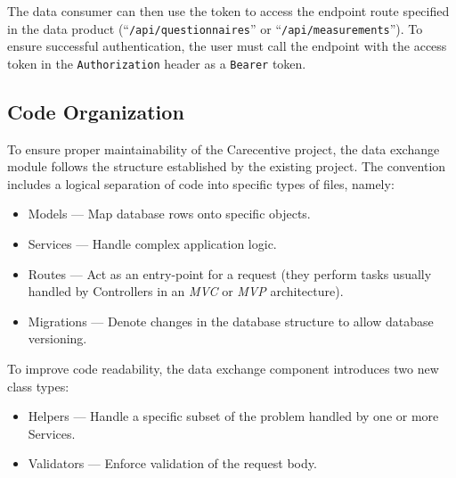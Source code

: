 The data consumer can then use the token to access the endpoint route specified in the data product (``\texttt{/api\-/questionnaires}'' or ``\texttt{/api\-/measurements}'').
To ensure successful authentication, the user must call the endpoint with the access token in the \texttt{Authorization} header as a \texttt{Bearer} token.

\subsection{Code Organization}\label{subsec:code-organization}

To ensure proper maintainability of the Carecentive project, the data exchange module follows the structure established by the existing project.
The convention includes a logical separation of code into specific types of files, namely:

\begin{itemize}
    \item Models --- Map database rows onto specific objects.
    \item Services --- Handle complex application logic.
    \item Routes --- Act as an entry-point for a request (they perform tasks usually handled by Controllers in an \textit{MVC} or \textit{MVP} architecture).
    \item Migrations --- Denote changes in the database structure to allow database versioning.
\end{itemize}

To improve code readability, the data exchange component introduces two new class types:
\begin{itemize}
    \item Helpers --- Handle a specific subset of the problem handled by one or more Services.
    \item Validators --- Enforce validation of the request body.
\end{itemize}

